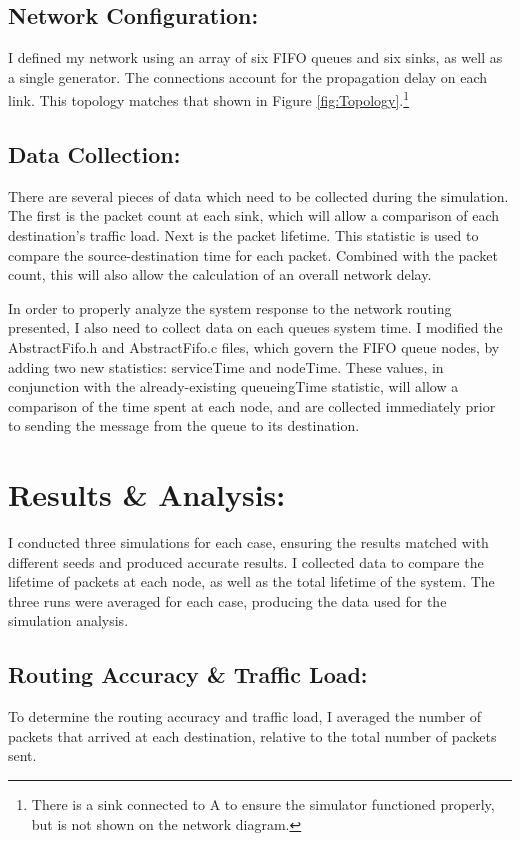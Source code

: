 \documentclass{article}
\begin{document}
\subsection{Network Configuration:}  
\label{subsec:Config}
I defined my network using an array of six FIFO queues and six sinks, as well as a single generator.
The connections account for the propagation delay on each link.
This topology matches that shown in Figure \ref{fig:Topology}.\footnote{There is a sink connected to A to ensure the simulator functioned properly, but is not shown on the network diagram.}


\subsection{Data Collection:}
\label{subsec:DataCollection}
There are several pieces of data which need to be collected during the simulation.
The first is the packet count at each sink, which will allow a comparison of each destination's traffic load.
Next is the packet lifetime.  
This statistic is used to compare the source-destination time for each packet.
Combined with the packet count, this will also allow the calculation of an overall network delay.

In order to properly analyze the system response to the network routing presented, I also need to collect data on each queues system time.
I modified the AbstractFifo.h and AbstractFifo.c files, which govern the FIFO queue nodes, by adding two new statistics:  serviceTime and nodeTime.
These values, in conjunction with the already-existing queueingTime statistic, will allow a comparison of the time spent at each node, and are collected immediately prior to sending the message from the queue to its destination.

\newpage
\section{Results \& Analysis:}
\label{sec:Results}
I conducted three simulations for each case, ensuring the results matched with different seeds and produced accurate results.
I collected data to compare the lifetime of packets at each node, as well as the total lifetime of the system.
The three runs were averaged for each case, producing the data used for the simulation analysis.

\subsection{Routing Accuracy \& Traffic Load:}
\label{subsec:RoutingResults}
To determine the routing accuracy and traffic load, I averaged the number of packets that arrived at each destination, relative to the total number of packets sent.
\end{document}
